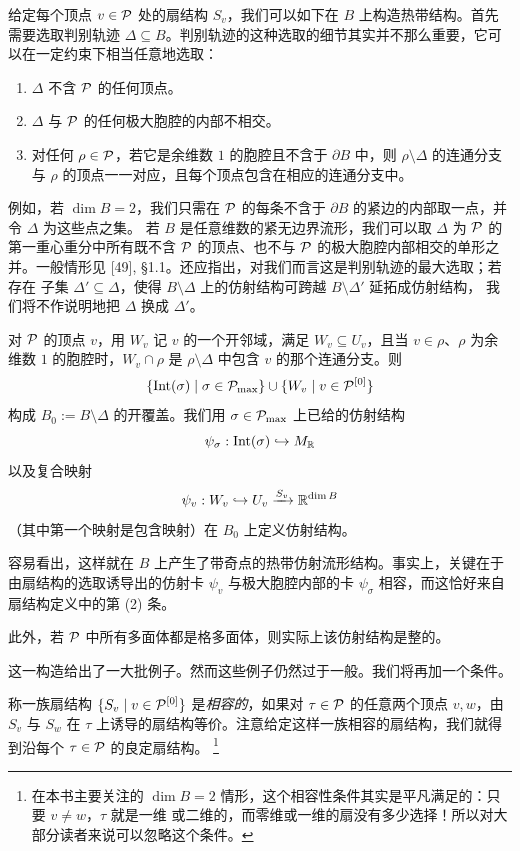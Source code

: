 给定每个顶点 $v\in\mathcal{P}$ 处的扇结构 $S_v$，我们可以如下在 $B$ 上构造热带结构。首先需要选取判别轨迹
$\Delta\subseteq B$。判别轨迹的这种选取的细节其实并不那么重要，它可以在一定约束下相当任意地选取：
\begin{enumerate}[label=(\arabic*),leftmargin=*]
\item $\Delta$ 不含 $\mathcal{P}$ 的任何顶点。
\item $\Delta$ 与 $\mathcal{P}$ 的任何极大胞腔的内部不相交。
\item 对任何 $\rho\in\mathcal{P}$，若它是余维数 $1$ 的胞腔且不含于 $\partial B$ 中，则 $\rho\setminus\Delta$ 的连通分支与
$\rho$ 的顶点一一对应，且每个顶点包含在相应的连通分支中。
\end{enumerate}
例如，若 $\dim B = 2$，我们只需在 $\mathcal{P}$ 的每条不含于 $\partial B$ 的紧边的内部取一点，并令 $\Delta$ 为这些点之集。
若 $B$ 是任意维数的紧无边界流形，我们可以取 $\Delta$ 为 $\mathcal{P}$ 的第一重心重分中所有既不含 $\mathcal{P}$ 的顶点、也不与
$\mathcal{P}$ 的极大胞腔内部相交的单形之并。一般情形见 [49], §1.1。还应指出，对我们而言这是判别轨迹的最大选取；若存在
子集 $\Delta' \subseteq \Delta$，使得 $B\setminus\Delta$ 上的仿射结构可跨越 $B\setminus\Delta'$ 延拓成仿射结构，
我们将不作说明地把 $\Delta$ 换成 $\Delta'$。

对 $\mathcal{P}$ 的顶点 $v$，用 $W_v$ 记 $v$ 的一个开邻域，满足 $W_v\subseteq U_v$，且当 $v\in\rho$、$\rho$ 为余维数 $1$
的胞腔时，$W_v\cap\rho$ 是 $\rho\setminus\Delta$ 中包含 $v$ 的那个连通分支。则
\[
\{\mathrm{Int}(\sigma) \mid \sigma\in\mathcal{P}_{\max}\} \cup \{W_v \mid v\in\mathcal{P}^{[0]}\}
\]
构成 $B_0 := B\setminus\Delta$ 的开覆盖。我们用 $\sigma\in\mathcal{P}_{\max}$ 上已给的仿射结构
\[
\psi_\sigma : \mathrm{Int}(\sigma) \hookrightarrow M_{\mathbb{R}}
\]
以及复合映射
\[
\psi_v : W_v \hookrightarrow U_v \xrightarrow{S_v} \mathbb{R}^{\dim B}
\]
（其中第一个映射是包含映射）在 $B_0$ 上定义仿射结构。

容易看出，这样就在 $B$ 上产生了带奇点的热带仿射流形结构。事实上，关键在于由扇结构的选取诱导出的仿射卡
$\psi_v$ 与极大胞腔内部的卡 $\psi_\sigma$ 相容，而这恰好来自扇结构定义中的第 (2) 条。

此外，若 $\mathcal{P}$ 中所有多面体都是格多面体，则实际上该仿射结构是整的。

这一构造给出了一大批例子。然而这些例子仍然过于一般。我们将再加一个条件。

称一族扇结构 $\{S_v \mid v\in\mathcal{P}^{[0]}\}$ 是\emph{相容的}，如果对 $\tau\in\mathcal{P}$ 的任意两个顶点 $v,w$，由 $S_v$ 与
$S_w$ 在 $\tau$ 上诱导的扇结构等价。注意给定这样一族相容的扇结构，我们就得到沿每个 $\tau\in\mathcal{P}$ 的良定扇结构。
\footnote{在本书主要关注的 $\dim B = 2$ 情形，这个相容性条件其实是平凡满足的：只要 $v\ne w$，$\tau$ 就是一维
或二维的，而零维或一维的扇没有多少选择！所以对大部分读者来说可以忽略这个条件。}

